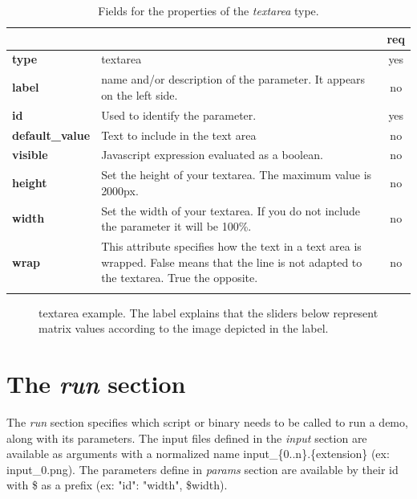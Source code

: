 \begin{longtable}{|>{\bf}L{\linewidth}|L{\linewidth}|c|}
\hline
      &  & {\bf req} 
\tabularnewline \hline \hline
 type           & textarea   & yes \\ \hline
 label          & name and/or description of the parameter. It appears on the left side. & no \\ \hline
 id             & Used to identify the parameter. & yes \\ \hline
 default\_value  & Text to include in the text area & no \\ \hline
visible    & Javascript expression evaluated as a boolean. & no  \\\hline
height  & Set the height of your textarea. The maximum value is 2000px.  & no \\ \hline
width  & Set the width of your textarea. If you do not include the parameter it will be 100\%.  & no \\ \hline
wrap   & This attribute specifies how the text in a text area is wrapped. False means that the line is not adapted to the textarea. True the opposite. & no \\ \hline
\caption{Fields for the properties of the \emph{textarea} type.}
\end{longtable}

\begin{figure}[h!]
\centering
{}
\caption{textarea example. The label explains that the sliders below represent matrix values according to the image depicted in the label.}
\label{fig:textarea_example}
\end{figure}

\section{The \emph{run} section}

The \emph{run} section specifies which script or binary needs to be called to run a demo, along with its parameters. The input files defined in the \emph{input} section are available as arguments with a normalized name input\_\{0..n\}.\{extension\} (ex: input\_0.png). The parameters define in \emph{params} section are available by their id with \$ as a prefix (ex: "id": "width", \$width).

